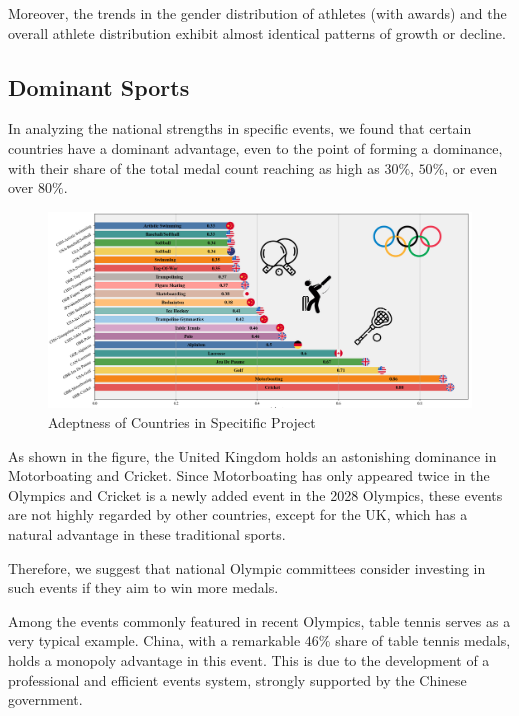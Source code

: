 \documentclass[12pt]{article}  %
\begin{document}
Moreover, the trends in the gender distribution of athletes (with awards) and the overall athlete distribution exhibit almost identical patterns of growth or decline.










\subsection{Dominant Sports}

In analyzing the national strengths in specific events, we found that certain countries have a dominant advantage, even to the point of forming a dominance, with their share of the total medal count reaching as high as \( 30\% \), \( 50\% \), or even over \( 80\% \).



\begin{figure}[H]
	\centering
	\includegraphics[width=16cm]{img/Monopolized Sports.png}
	\caption{Adeptness of Countries in Specitific Project}
	\label{fig:aa}
\end{figure}

As shown in the figure, the United Kingdom holds an astonishing dominance in Motorboating and Cricket. Since Motorboating has only appeared twice in the Olympics and Cricket is a newly added event in the 2028 Olympics, these events are not highly regarded by other countries, except for the UK, which has a natural advantage in these traditional sports.

Therefore, we suggest that national Olympic committees consider investing in such events if they aim to win more medals.


Among the events commonly featured in recent Olympics, table tennis serves as a very typical example. China, with a remarkable \( 46\% \) share of table tennis medals, holds a monopoly advantage in this event. This is due to the development of a professional and efficient events system, strongly supported by the Chinese government.
\end{document}
